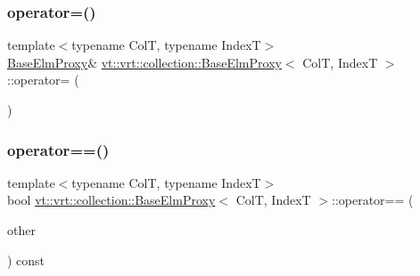\subsubsection{\texorpdfstring{operator=()}{operator=()}}
{\footnotesize\ttfamily template$<$typename ColT, typename IndexT$>$ \\
\hyperlink{structvt_1_1vrt_1_1collection_1_1_base_elm_proxy}{Base\+Elm\+Proxy}\& \hyperlink{structvt_1_1vrt_1_1collection_1_1_base_elm_proxy}{vt\+::vrt\+::collection\+::\+Base\+Elm\+Proxy}$<$ ColT, IndexT $>$\+::operator= (\begin{DoxyParamCaption}\item[{\hyperlink{structvt_1_1vrt_1_1collection_1_1_base_elm_proxy}{Base\+Elm\+Proxy}$<$ ColT, IndexT $>$ const \&}]{ }\end{DoxyParamCaption})\hspace{0.3cm}{\ttfamily [default]}}

\mbox{\label{structvt_1_1vrt_1_1collection_1_1_base_elm_proxy_a793fdd9d1bac6b5974f8579781bad7ab}} 
\subsubsection{\texorpdfstring{operator==()}{operator==()}}
{\footnotesize\ttfamily template$<$typename ColT, typename IndexT$>$ \\
bool \hyperlink{structvt_1_1vrt_1_1collection_1_1_base_elm_proxy}{vt\+::vrt\+::collection\+::\+Base\+Elm\+Proxy}$<$ ColT, IndexT $>$\+::operator== (\begin{DoxyParamCaption}\item[{\hyperlink{structvt_1_1vrt_1_1collection_1_1_base_elm_proxy}{Base\+Elm\+Proxy}$<$ ColT, IndexT $>$ const \&}]{other }\end{DoxyParamCaption}) const\hspace{0.3cm}{\ttfamily [inline]}}

\mbox{\label{structvt_1_1vrt_1_1collection_1_1_base_elm_proxy_ab4d3d05dd4576d7554f7b211c8f6bfc1}} 

